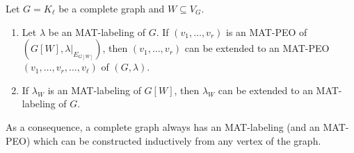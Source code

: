 
\begin{lemma}\label{MAT-L-PEO of complete graph}
Let $ G = K_{\ell} $ be a complete graph and $ W \subseteq V_{G} $. 
\begin{enumerate}[(1)]
\item\label{MAT-L-PEO of complete graph 1} 
Let $ \lambda $ be an MAT-labeling of $ G$. If $ (v_{1}, \dots, v_{r}) $ is an MAT-PEO  of $ (G[W], \lambda|_{E_{G[W]}}) $, then $ (v_{1}, \dots, v_{r}) $ can be extended to an MAT-PEO $ (v_{1}, \dots, v_{r}, \dots, v_{\ell}) $ of $ (G,\lambda) $. 
\item\label{MAT-L-PEO of complete graph 2} 

If $ \lambda_{W} $ is an MAT-labeling of $ G[W] $, then $ \lambda_{W} $ can be extended to an MAT-labeling of $ G $. 

\end{enumerate}
As a consequence, a complete graph always has an MAT-labeling (and an MAT-PEO) which can be constructed inductively from any vertex of the graph.
\end{lemma}
